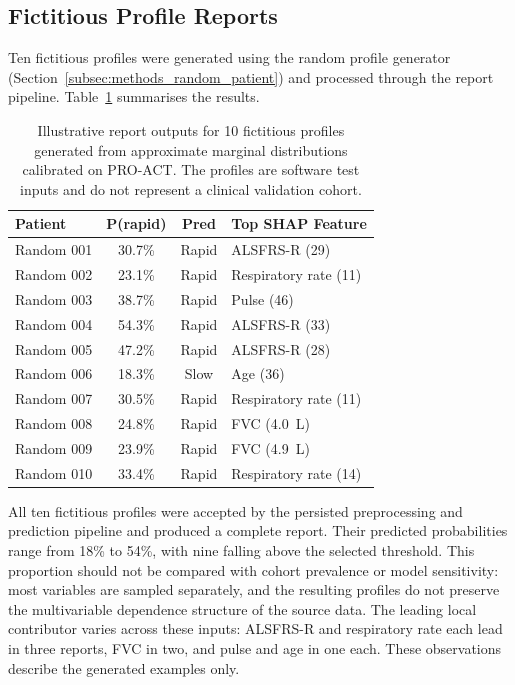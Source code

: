 \subsection{Fictitious Profile Reports}
\label{subsec:results_synthetic_reports}

Ten fictitious profiles were generated using the random profile generator (Section~\ref{subsec:methods_random_patient}) and processed through the report pipeline.
Table~\ref{tab:synthetic_patient_reports} summarises the results.

\begin{table}[ht!]
\centering
\caption[Reports for 10 fictitious profiles]{Illustrative report outputs for 10 fictitious profiles generated from approximate marginal distributions calibrated on PRO-ACT. The profiles are software test inputs and do not represent a clinical validation cohort.}
\label{tab:synthetic_patient_reports}
\small
\begin{tabular}{lccl}
\toprule
Patient & P(rapid) & Pred & Top SHAP Feature \\
\midrule
Random 001 & 30.7\% & Rapid & ALSFRS-R (29) \\
Random 002 & 23.1\% & Rapid & Respiratory rate (11) \\
Random 003 & 38.7\% & Rapid & Pulse (46) \\
Random 004 & 54.3\% & Rapid & ALSFRS-R (33) \\
Random 005 & 47.2\% & Rapid & ALSFRS-R (28) \\
Random 006 & 18.3\% & Slow  & Age (36) \\
Random 007 & 30.5\% & Rapid & Respiratory rate (11) \\
Random 008 & 24.8\% & Rapid & FVC (4.0~L) \\
Random 009 & 23.9\% & Rapid & FVC (4.9~L) \\
Random 010 & 33.4\% & Rapid & Respiratory rate (14) \\
\bottomrule
\end{tabular}
\end{table}
\newpage
\noindent All ten fictitious profiles were accepted by the persisted preprocessing and prediction pipeline and produced a complete report.
Their predicted probabilities range from 18\% to 54\%, with nine falling above the selected threshold.
This proportion should not be compared with cohort prevalence or model sensitivity: most variables are sampled separately, and the resulting profiles do not preserve the multivariable dependence structure of the source data.
The leading local contributor varies across these inputs: ALSFRS-R and respiratory rate each lead in three reports, FVC in two, and pulse and age in one each.
These observations describe the generated examples only.

